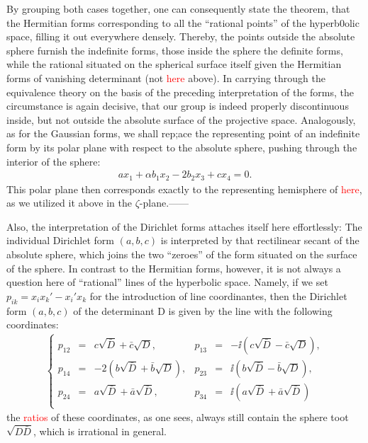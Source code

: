 By grouping both cases together, one can consequently state the theorem, that the Hermitian forms corresponding to all the “rational points” of the hyperb0olic space, filling it out everywhere densely. Thereby, the points outside the absolute sphere furnish the indefinite forms, those inside the sphere the definite forms, while the rational situated on the spherical surface itself given the Hermitian forms of vanishing determinant (not \textcolor{red}{here} above).
In carrying through the equivalence theory on the basis of the preceding interpretation of the forms, the circumstance is again decisive, that our group is indeed properly discontinuous inside, but not outside the absolute surface of the projective space. Analogously, as for the Gaussian forms, we shall rep;ace the representing point of an indefinite form by its polar plane with respect to the absolute sphere, pushing through the interior of the sphere: 
\begin{align}
ax_1+\alpha b_1x_2-2b_2x_3+cx_4=0.
\end{align}
This polar plane then corresponds exactly to the representing hemisphere of \textcolor{red}{here}, as we utilized it above in the $\zeta$-plane.——

Also, the interpretation of the Dirichlet forms attaches itself here effortlessly: The individual Dirichlet form $(a,b,c)$ is interpreted by that rectilinear secant of the absolute sphere, which joins the two “zeroes” of the form situated on the surface of the sphere. In contrast to the Hermitian forms, however, it is not always a question here of “rational” lines of the hyperbolic space. Namely, if we set $p_{ik}=x_ix_k'-x_i'x_k$ for the introduction of line coordinantes, then the Dirichlet form $(a,b,c)$ of the determinant D is given by the line with the following coordinates:
\begin{align}
\left\{\begin{array}{rclrcl}
p_{12}&=& c\sqrt{\bar{D}}+\bar{c}\sqrt{D},& p_{13}&=& -\ii\left(c\sqrt{\bar{D}}-\bar{c}\sqrt{D}\right),\\
p_{14}&=& -2\left(b\sqrt{\bar{D}}+\bar{b}\sqrt{D}\right),& p_{23}&=& \ii\left(b\sqrt{\bar{D}}-\bar{b}\sqrt{D}\right),\\
p_{24}&=& a\sqrt{\bar{D}}+\bar{a}\sqrt{\bar{D}},& p_{34}&=& \ii\left(a\sqrt{\bar{D}}+\bar{a}\sqrt{\bar{D}}\right)\\
\end{array}\right.
\end{align}
the \textcolor{red}{ratios} of these coordinates, as one sees, always still contain the sphere toot $\sqrt{D\bar{D}}$, which is irrational in general.

